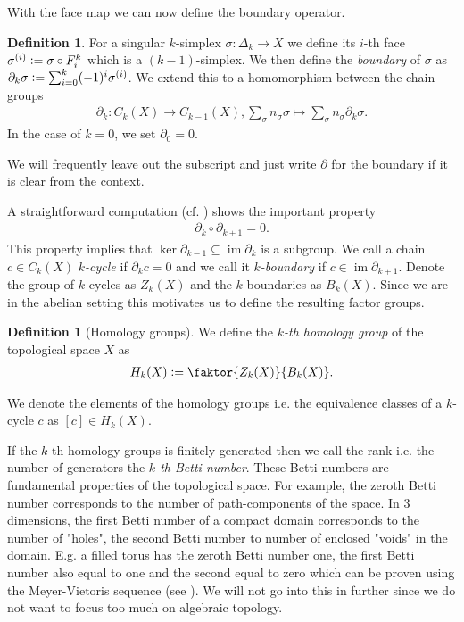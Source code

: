 \documentclass[12pt,a4paper]{article}
\numberwithin{equation}{subsection}
\numberwithin{lemma}{subsection}
\theoremstyle{definition}
\newtheorem{definition}[lemma]{Definition}
\DeclareMathOperator{\Ima}{im}
\begin{document}
With the face map we can now define the boundary operator.
\begin{definition}
    For a singular $k$-simplex $\sigma: \Delta_k \rightarrow X$ we define its $i$-th face 
    $\sigma^{(i)} \vcentcolon= \sigma \circ F_i^k$ which is a $(k-1)$-simplex. 
    We then define the \textit{boundary} of $\sigma$ as 
    $\partial_k \sigma \vcentcolon= \sum_{i=0}^k (-1)^i \sigma^{(i)}$. We extend this 
    to a homomorphism between the chain groups
    \begin{align*}
        \partial_k: C_k(X) \rightarrow C_{k-1}(X), 
        \sum_\sigma n_\sigma \sigma \mapsto \sum_\sigma n_\sigma \partial_k \sigma.
    \end{align*}
    In the case of $k=0$, we set $\partial_0 = 0$.
\end{definition}
We will frequently leave out the subscript and just write $\partial$ for the boundary 
if it is clear from the context.

A straightforward computation (cf. \cite[Lemma 1.6]{topology_and_geometry}) shows the 
important property 
\begin{align*}
    \partial_k \circ \partial_{k+1} = 0.
\end{align*}
This property implies that $\ker \partial_{k-1} \subseteq \Ima \partial_k$ is 
a subgroup. We call a chain $c \in C_k(X)$ \textit{$k$-cycle} if $\partial_k c = 0$ and 
we call it \textit{$k$-boundary} if $c \in \Ima \partial_{k+1}$. 
Denote the group of $k$-cycles as $Z_k(X)$ and the $k$-boundaries as $B_k(X)$.
Since we are in the abelian setting this motivates us to define 
the resulting factor groups.
\begin{definition}[Homology groups]
    We define the \textit{$k$-th homology group} of the topological space $X$ as
    \begin{align*}
        H_k(X) \vcentcolon= \faktor{Z_k(X)}{B_k(X)}.
    \end{align*} 
\end{definition}
We denote the elements of the homology groups i.e. the equivalence classes of a 
$k$-cycle $c$ as $[c] \in H_k(X)$.

If the $k$-th homology groups is finitely generated then we 
call the rank i.e. the number of generators the \textit{$k$-th Betti number}. 
These Betti numbers are fundamental properties of the topological space. 
For example, the zeroth Betti number corresponds to the number of 
path-components of the space. In 3 dimensions, the first Betti number of 
a compact domain
corresponds to the number of "holes", the second Betti number to 
number of enclosed "voids" in the domain. E.g. a filled torus 
has the zeroth Betti number one, the first Betti number also equal to one
and the second equal to zero which can be proven using the Meyer-Vietoris sequence
(see \cite[Sec.\,IV.18]{topology_and_geometry}). We will not go into this in further
since we do not want to focus too much on algebraic topology.
\end{document}
